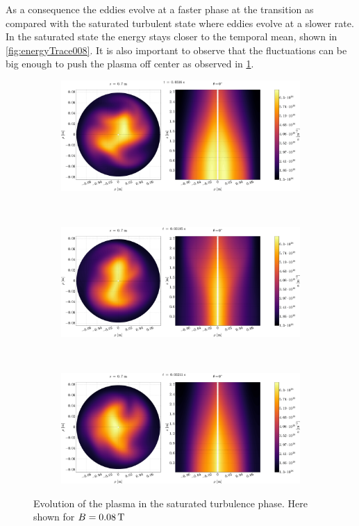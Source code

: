 As a consequence the eddies evolve at a faster phase at the transition as compared with the saturated turbulent state where eddies evolve at a slower rate.
In the saturated state the energy stays closer to the temporal mean, shown in \cref{fig:energyTrace008}.
It is also important to observe that the fluctuations can be big enough to push the plasma off center as observed in \cref{fig:turbEv}.
%
\begin{figure}[htbp]
    \centering
    \begin{subfigure}[h]{1.00\textwidth}
        \centering
        \includegraphics[width=1.0\textwidth]{fig/results/evolution/n-perpPar-2D-0}
    \end{subfigure}%
    \\
    \begin{subfigure}[h]{1.00\textwidth}
        \centering
        \includegraphics[width=1.0\textwidth]{fig/results/evolution/n-perpPar-2D-1}
    \end{subfigure}
    \\
    \begin{subfigure}[h]{1.00\textwidth}
        \centering
        \includegraphics[width=1.0\textwidth]{fig/results/evolution/n-perpPar-2D-2}
    \end{subfigure}
    \caption{Evolution of the plasma in the saturated turbulence phase.
        Here shown for $B=0.08\, \text{T}$}
    \label{fig:turbEv}
\end{figure}
